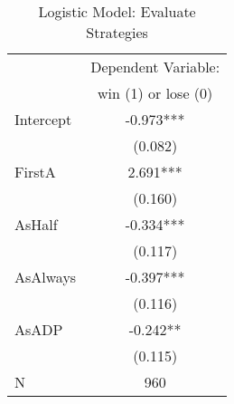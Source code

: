 \begin{table}
\caption{Logistic Model: Evaluate Strategies}
\begin{center}
\begin{tabular}{lc}
\hline
          & Dependent Variable:   \\
          &  win (1) or lose (0)  \\
\midrule
Intercept & -0.973***             \\
          & (0.082)               \\
FirstA    & 2.691***              \\
          & (0.160)               \\
AsHalf    & -0.334***             \\
          & (0.117)               \\
AsAlways  & -0.397***             \\
          & (0.116)               \\
AsADP     & -0.242**              \\
          & (0.115)               \\
N         & 960                   \\
\hline
\end{tabular}
\end{center}
\end{table}